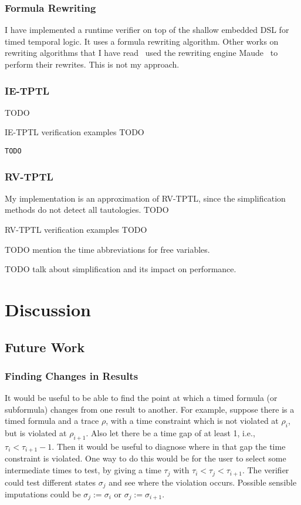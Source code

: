 \documentclass[a4paper]{article}
\begin{document}
\subsubsection{Formula Rewriting}
I have implemented a runtime verifier on top of the shallow embedded DSL for timed temporal logic. It uses a formula rewriting algorithm.
Other works on rewriting algorithms that I have read~\autocites{rosu2005rewriting,chai2013rewriting} used the rewriting engine Maude~\autocite{clavel2002maude} to perform their rewrites. This is not my approach.

\subsubsection{IE-TPTL}
TODO
\begin{eg}{IE-TPTL verification examples}
  TODO
\end{eg}

\begin{lstlisting}[caption={Finalise method for IE-TPTL}]
TODO
\end{lstlisting}
\subsubsection{RV-TPTL}
My implementation is an approximation of RV-TPTL, since the simplification methods do not detect all tautologies.
TODO
\begin{eg}{RV-TPTL verification examples}
  TODO
\end{eg}

TODO mention the time abbreviations for free variables.

TODO talk about simplification and its impact on performance.

\section{Discussion}
\subsection{Future Work}

\subsubsection{Finding Changes in Results}
It would be useful to be able to find the point at which a timed formula (or subformula) changes from one result to another. For example, suppose there is a timed formula and a trace $\rho$, with a time constraint which is not violated at $\rho_i$, but is violated at $\rho_{i+1}$. Also let there be a time gap of at least 1, i.e., $\tau_i < \tau_{i+1} - 1$. Then it would be useful to diagnose where in that gap the time constraint is violated. One way to do this would be for the user to select some intermediate times to test, by giving a time $\tau_j$ with $\tau_i < \tau_j < \tau_{i+1}$. The verifier could test different states $\sigma_j$ and see where the violation occurs. Possible sensible imputations could be $\sigma_j := \sigma_i$ or $\sigma_j := \sigma_{i+1}$.
\end{document}
